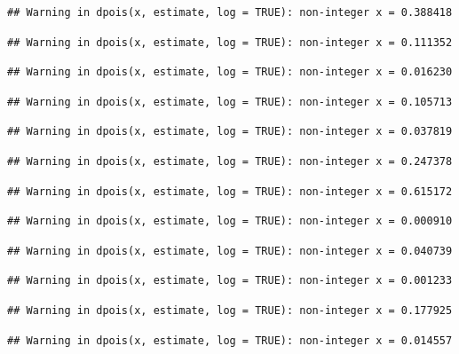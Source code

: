 \documentclass[]{article}
\begin{document}
\begin{verbatim}
## Warning in dpois(x, estimate, log = TRUE): non-integer x = 0.388418
\end{verbatim}

\begin{verbatim}
## Warning in dpois(x, estimate, log = TRUE): non-integer x = 0.111352
\end{verbatim}

\begin{verbatim}
## Warning in dpois(x, estimate, log = TRUE): non-integer x = 0.016230
\end{verbatim}

\begin{verbatim}
## Warning in dpois(x, estimate, log = TRUE): non-integer x = 0.105713
\end{verbatim}

\begin{verbatim}
## Warning in dpois(x, estimate, log = TRUE): non-integer x = 0.037819
\end{verbatim}

\begin{verbatim}
## Warning in dpois(x, estimate, log = TRUE): non-integer x = 0.247378
\end{verbatim}

\begin{verbatim}
## Warning in dpois(x, estimate, log = TRUE): non-integer x = 0.615172
\end{verbatim}

\begin{verbatim}
## Warning in dpois(x, estimate, log = TRUE): non-integer x = 0.000910
\end{verbatim}

\begin{verbatim}
## Warning in dpois(x, estimate, log = TRUE): non-integer x = 0.040739
\end{verbatim}

\begin{verbatim}
## Warning in dpois(x, estimate, log = TRUE): non-integer x = 0.001233
\end{verbatim}

\begin{verbatim}
## Warning in dpois(x, estimate, log = TRUE): non-integer x = 0.177925
\end{verbatim}

\begin{verbatim}
## Warning in dpois(x, estimate, log = TRUE): non-integer x = 0.014557
\end{verbatim}
\end{document}
